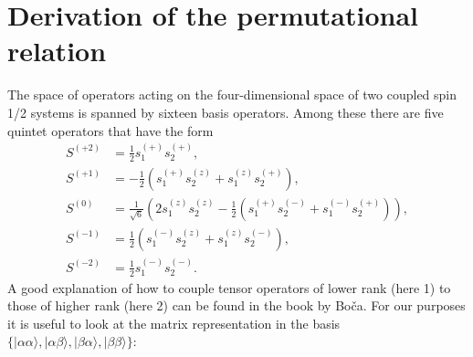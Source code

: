 \section{Derivation of the permutational relation}
\label{Ap:permrel}
The space of operators acting on the four-dimensional space of two coupled spin 1/2 systems is spanned by sixteen basis operators. Among these there are five quintet operators that have the form\cite{McWee_1965_1717}
	\begin{align}
	{S^{( + 2)}} &= \frac{1}{2}s_1^{( + )}s_2^{( + )}, \\
	{S^{( + 1)}} &=  - \frac{1}{2}(s_1^{( + )}s_2^{(z)} + s_1^{(z)}s_2^{( + )}), \\
	{S^{(0)}} &= \frac{1}{{\sqrt 6 }}(2s_1^{(z)}s_2^{(z)} - \frac{1}{2}(s_1^{( + )}s_2^{( - )} + s_1^{( - )}s_2^{( + )})), \\
	{S^{( - 1)}} &= \frac{1}{2}(s_1^{( - )}s_2^{(z)} + s_1^{(z)}s_2^{( - )}), \\
	{S^{( - 2)}} &= \frac{1}{2}s_1^{( - )}s_2^{( - )}.
	\end{align} 	
A good explanation of how to couple tensor operators of lower rank (here 1) to those of higher rank (here 2) can be found in the book by Boča.\cite{Boca_1999_} For our purposes it is useful to look at the matrix representation in the basis $\{ |\alpha \alpha \rangle ,|\alpha \beta \rangle ,|\beta \alpha \rangle ,|\beta \beta \rangle \} $:
